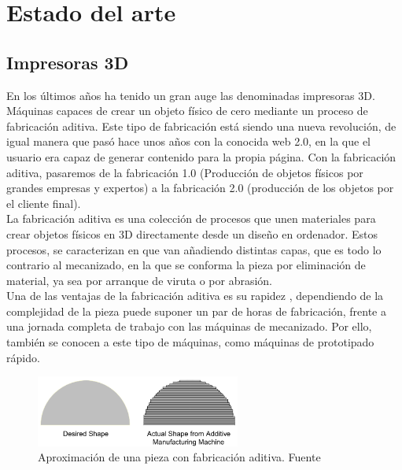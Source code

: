 \chapter{Estado del arte}
\label{estado.arte}

\section{Impresoras 3D}
\label{arte_immpresoras}

En los últimos años ha tenido un gran auge las denominadas impresoras 3D. Máquinas capaces de crear un objeto físico de cero mediante un proceso de fabricación aditiva. Este tipo de fabricación está siendo una nueva revolución, de igual manera que pasó hace unos años con la conocida web 2.0, en la que el usuario era capaz de generar contenido para la propia página. Con la fabricación aditiva, pasaremos de la fabricación 1.0 (Producción de objetos físicos por grandes empresas y expertos) a la fabricación 2.0 (producción de los objetos por el cliente final).\cite{additive}\\

La fabricación aditiva es una colección de procesos que unen materiales para crear objetos físicos en 3D directamente desde un diseño en ordenador. Estos procesos, se caracterizan en que van añadiendo distintas capas, que es todo lo contrario al mecanizado, en la que se conforma la pieza por eliminación de material, ya sea por arranque de viruta o por abrasión.\\

Una de las ventajas de la fabricación aditiva es su rapidez \cite{additivevssubtractive}, dependiendo de la complejidad de la pieza puede suponer un par de horas de fabricación, frente a una jornada completa de trabajo con las máquinas de mecanizado. Por ello, también se conocen a este tipo de máquinas, como máquinas de prototipado rápido.\\

    \begin{figure}[H]
            \centering
            \includegraphics[width=0.6\textwidth]{images/aproximacion_am.png}
            \caption{Aproximación de una pieza con fabricación aditiva. Fuente \cite{additive}}
            \label{fig:approach_am}
    \end{figure}

